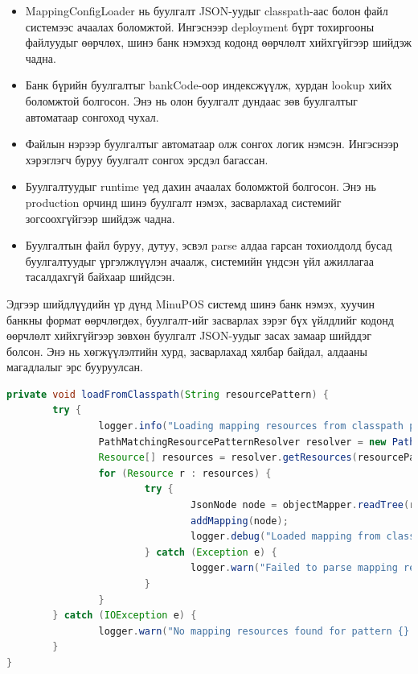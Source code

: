 \begin{itemize}
	\item MappingConfigLoader нь буулгалт JSON-уудыг classpath-аас болон файл системээс ачаалах боломжтой. Ингэснээр deployment бүрт тохиргооны файлуудыг өөрчлөх, шинэ банк нэмэхэд кодонд өөрчлөлт хийхгүйгээр шийдэж чадна.
	\item Банк бүрийн буулгалтыг bankCode-оор индексжүүлж, хурдан lookup хийх боломжтой болгосон. Энэ нь олон буулгалт дундаас зөв буулгалтыг автоматаар сонгоход чухал.
	\item Файлын нэрээр буулгалтыг автоматаар олж сонгох логик нэмсэн. Ингэснээр хэрэглэгч буруу буулгалт сонгох эрсдэл багассан.
	\item Буулгалтуудыг runtime үед дахин ачаалах боломжтой болгосон. Энэ нь production орчинд шинэ буулгалт нэмэх, засварлахад системийг зогсоохгүйгээр шийдэж чадна.
	\item Буулгалтын файл буруу, дутуу, эсвэл parse алдаа гарсан тохиолдолд бусад буулгалтуудыг үргэлжлүүлэн ачаалж, системийн үндсэн үйл ажиллагаа тасалдахгүй байхаар шийдсэн.
\end{itemize}

Эдгээр шийдлүүдийн үр дүнд MinuPOS системд шинэ банк нэмэх, хуучин банкны формат өөрчлөгдөх, буулгалт-ийг засварлах зэрэг бүх үйлдлийг кодонд өөрчлөлт хийхгүйгээр зөвхөн буулгалт JSON-уудыг засах замаар шийддэг болсон. Энэ нь хөгжүүлэлтийн хурд, засварлахад хялбар байдал, алдааны магадлалыг эрс бууруулсан.

\begin{lstlisting}[language=Java, frame=single, caption=Classpath-аас буулгалтын JSON-уудыг ачаалах]
private void loadFromClasspath(String resourcePattern) {
		try {
				logger.info("Loading mapping resources from classpath pattern '{}'", resourcePattern);
				PathMatchingResourcePatternResolver resolver = new PathMatchingResourcePatternResolver();
				Resource[] resources = resolver.getResources(resourcePattern);
				for (Resource r : resources) {
						try {
								JsonNode node = objectMapper.readTree(r.getInputStream());
								addMapping(node);
								logger.debug("Loaded mapping from classpath resource: {}", r.getFilename());
						} catch (Exception e) {
								logger.warn("Failed to parse mapping resource {}: {}", r.getFilename(), e.getMessage());
						}
				}
		} catch (IOException e) {
				logger.warn("No mapping resources found for pattern {}: {}", resourcePattern, e.getMessage());
		}
}
\end{lstlisting}

